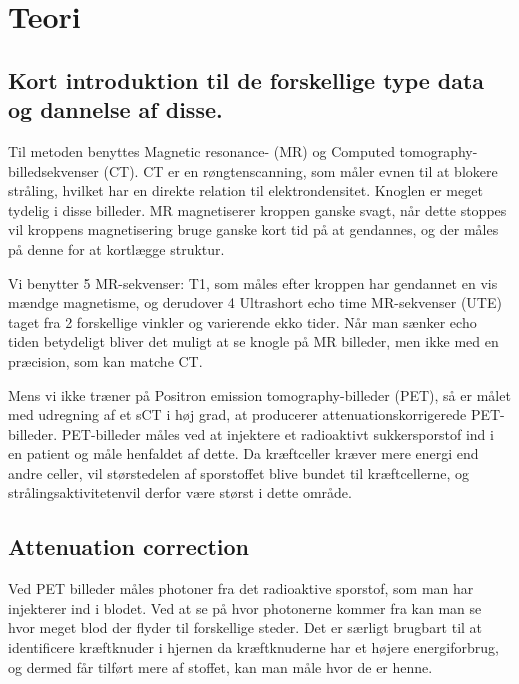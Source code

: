 \section{Teori}
\subsection{Kort introduktion til de forskellige type data og dannelse af disse.}



Til metoden benyttes Magnetic resonance- (MR) og Computed
tomography-billedsekvenser (CT). CT er en røngtenscanning, som måler
evnen til at blokere stråling, hvilket har en direkte relation til
elektrondensitet. Knoglen er meget tydelig i disse billeder. MR magnetiserer
kroppen ganske svagt, når dette stoppes vil kroppens magnetisering bruge
ganske kort tid på at gendannes, og der måles på denne for at kortlægge
struktur.

Vi benytter 5 MR-sekvenser: T1, som måles efter kroppen har gendannet en vis
mændge magnetisme, og derudover 4 Ultrashort echo time MR-sekvenser (UTE)
taget fra 2 forskellige vinkler og varierende ekko tider. Når man sænker echo
tiden betydeligt bliver det muligt at se knogle på MR billeder, men ikke med
en præcision, som kan matche CT.

Mens vi ikke træner på Positron emission tomography-billeder (PET),
så er målet med udregning af et sCT i høj grad, at producerer
attenuationskorrigerede PET-billeder. PET-billeder måles ved at injektere
et radioaktivt sukkersporstof ind i en patient og måle henfaldet af dette. Da
kræftceller kræver mere energi end andre celler, vil størstedelen af
sporstoffet blive bundet til kræftcellerne, og strålingsaktivitetenvil derfor
være størst i dette område. 

\subsection{Attenuation correction} 

Ved PET billeder måles photoner fra det radioaktive sporstof, som man har
injekterer ind i blodet. Ved at se på hvor photonerne kommer fra kan man se
hvor meget blod der flyder til forskellige steder. Det er særligt brugbart
til at identificere kræftknuder i hjernen da kræftknuderne har et højere
energiforbrug, og dermed får tilført mere af stoffet, kan man måle hvor de
er henne.

